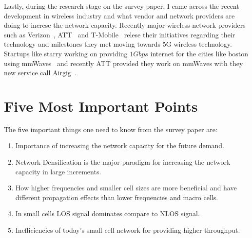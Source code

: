 \documentclass[12pt,onecolumn]{IEEEtran}
\begin{document}
Lastly, during the research stage on the survey paper, I came across the recent development in wireless industry and what vendor and network providers are doing to increse the network capacity. Recently major wireless network providers such as Verizon~\cite{verizon5g}, ATT~\cite{att5g} and T-Mobile~\cite{tmobile5g} relese their initiatives regarding their technology and milestones they met moving towards 5G wireless technology. Startups like starry working on providing $1Gbps$ internet for the cities like boston using mmWaves~\cite{techinsider} and recently ATT provided they work on mmWaves with they new service call Airgig~\cite{att}.
\section{Five Most Important Points}
\label{sec:FMIP}

The five important things one need to know from the survey paper are:
\renewcommand{\labelenumi}{\arabic{enumi}}
\begin{enumerate}
   \item Importance of increasing the network capacity for the future demand.
   \item Network Densification is the major paradigm for increasing the network capacity in large increments.
   \item How higher frequencies and smaller cell sizes are more beneficial and have different propagation effects than lower frequencies and macro cells.
   \item In small cells LOS signal dominates compare to NLOS signal.
   \item Inefficiencies of today's small cell network for providing higher throughput.
\end{enumerate}

\ifCLASSOPTIONcaptionsoff
  \newpage
\fi



\end{document}
